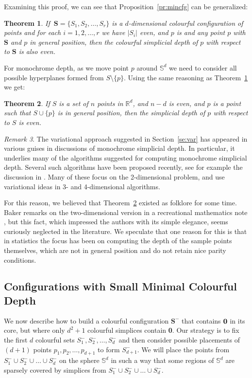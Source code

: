 \documentclass[epsbox,12pt,reqno]{amsart}
\newtheorem{theorem}{Theorem}[section]  %
\theoremstyle{definition}
\theoremstyle{remark}
\newtheorem{remark}[theorem]{Remark}
\def\S{\mathbf{S}}
\def\R{\mathbb{R}}
\def\Sph{\mathbb{S}}
\def\zero{{\bf 0}}
\begin{document}
Examining this proof, we can see that Proposition~\ref{pr:mincfg} can
be generalized:
\begin{theorem}\label{th:cparity}
If $\:\S=\{S_1, S_2, \ldots, S_r\}$ is a $d$-dimensional colourful 
configuration of points
and for each $i=1,2, \ldots, r$ we have $|S_i|$ even, and $p$ is
and any point $p$ with $\S$ and $p$ in general position, then the colourful
simplicial depth of $p$ with respect
to $\S$ is also even.
\end{theorem}

For monochrome depth, as we move point $p$ around $\Sph^d$
we need to consider all possible hyperplanes formed from 
$S \setminus \{p\}$.  Using the same reasoning as 
Theorem~\ref{th:cparity} we get:
\begin{theorem}\label{th:mparity}
If $S$ is a set of $n$ points in $\R^d$, and $n-d$ is even,
and $p$ is a point such that $S \cup \{p\}$ is in general position, 
then the simplicial depth of $p$ with respect to $S$ is even.
\end{theorem}

\begin{remark}
The variational approach suggested in Section~\ref{se:var}
has appeared in various guises in discussions of monochrome
simplicial depth.  In particular, it underlies many of the
algorithms suggested for computing monochrome simplicial depth.
Several such algorithms have been proposed recently, see for
example the discussion in \cite{Alo05}.  
Many of these focus on the 2-dimensional problem, 
\cite{GSW92} and \cite{CO01} use variational ideas in
3- and 4-dimensional algorithms.

For this reason, 
we believed that Theorem~\ref{th:mparity} existed as
folklore for some time.  
Baker remarks on the two-dimensional version in a
recreational mathematics note \cite{Bak78}, but this fact,
which impressed the authors with its simple elegance, 
seems curiously neglected in the literature.  
We speculate that one reason for this
is that in statistics the focus has been on computing the depth of the 
sample points themselves, which are not in general position and 
do not retain nice parity conditions.
\end{remark}

\subsection{Configurations with Small Minimal Colourful Depth}\label{se:cons}
We now describe how to build a colourful configuration $\S^\minus$
that contains $\zero$ in its core, but where only $d^2+1$ colourful
simplices contain \zero.  Our strategy is to fix the first $d$
colourful sets $S_1^\minus, S_2^\minus, \ldots, S_d^\minus$ and then consider possible
placements of $(d+1)$ points $p_1, p_2, \ldots, p_{d+1}$ to form
$S_{d+1}^\minus$.  We will place the points from 
$S_1^\minus \cup S_2^\minus \cup \ldots \cup S_d^\minus$ on
the sphere $\Sph^d$ in such a way that some regions of $\Sph^d$
are sparsely covered by simplices from 
$S_1^\minus \cup S_2^\minus \cup \ldots \cup S_d^\minus$.
\end{document}

